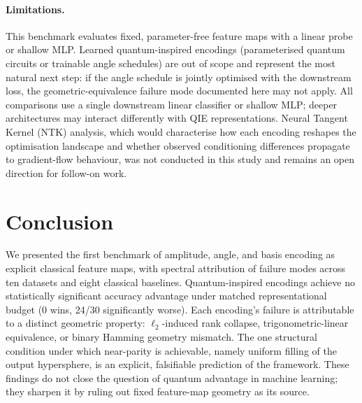 \documentclass[12pt]{article}
\begin{document}
\paragraph{Limitations.}
This benchmark evaluates fixed, parameter-free feature maps with a linear
probe or shallow MLP.
Learned quantum-inspired encodings (parameterised quantum circuits or trainable
angle schedules) are out of scope and represent the most natural next step:
if the angle schedule is jointly optimised with the downstream loss, the
geometric-equivalence failure mode documented here may not apply.
All comparisons use a single downstream linear classifier or shallow MLP;
deeper architectures may interact differently with QIE representations.
Neural Tangent Kernel (NTK) analysis, which would characterise how each
encoding reshapes the optimisation landscape and whether observed conditioning
differences propagate to gradient-flow behaviour, was not conducted in this
study and remains an open direction for follow-on work.

\section{Conclusion}
\label{sec:conclusion}

We presented the first benchmark of amplitude, angle, and basis encoding as
explicit classical feature maps, with spectral attribution of failure modes
across ten datasets and eight classical baselines.
Quantum-inspired encodings achieve no statistically significant accuracy
advantage under matched representational budget (0 wins, 24/30 significantly
worse).
Each encoding's failure is attributable to a distinct geometric property:
$\ell_2$-induced rank collapse, trigonometric-linear equivalence, or binary
Hamming geometry mismatch.
The one structural condition under which near-parity is achievable, namely
uniform filling of the output hypersphere, is an explicit, falsifiable
prediction of the framework.
These findings do not close the question of quantum advantage in machine
learning; they sharpen it by ruling out fixed feature-map geometry as its
source.



\appendix
\end{document}
